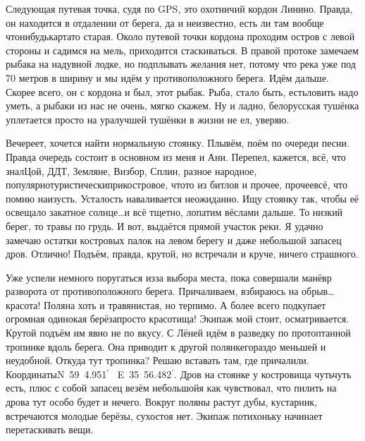 Следующая путевая точка, судя по GPS, это охотничий кордон Линино. Правда, он находится в отдалении от берега, да и неизвестно, есть ли там вообще что\sdash нибудь\mdash карта\sdash то старая. Около путевой точки кордона проходим остров с левой стороны и садимся на мель, приходится стаскиваться. В правой протоке замечаем рыбака на надувной лодке, но подплывать желания нет, потому что река уже под 70 метров в ширину и мы идём у противоположного берега. Идём дальше. Скорее всего, он с кордона и был, этот рыбак. Рыба, стало быть, есть\mdash ловить надо уметь, а рыбаки из нас не очень, мягко скажем. Ну и ладно, белорусская тушёнка уплетается просто на ура\mdash лучшей тушёнки в жизни не ел, уверяю.

Вечереет, хочется найти нормальную стоянку. Плывём, поём по очереди песни. Правда очередь состоит в основном из меня и Ани. Перепел, кажется, всё, что знал\mdash Цой, ДДТ, Земляне, Визбор, Сплин, разное народное, популярно\sdash туристически\sdash прикостровое, что\sdash то из битлов и прочее, прочее\mdash всё, что помню наизусть. Усталость наваливается неожиданно. Ищу стоянку так, чтобы её освещало закатное солнце\ldots и всё тщетно, лопатим вёслами дальше. То низкий берег, то травы по грудь. И вот, выдаётся прямой участок реки. Я удачно замечаю остатки костровых палок на левом берегу и даже небольшой запасец дров. Отлично! Подъём, правда, крутой, но встречали и круче, ничего страшного.

Уже успели немного поругаться из\sdash за выбора места, пока совершали манёвр разворота от противоположного берега. Причаливаем, взбираюсь на обрыв\ldots красота! Поляна хоть и травянистая, но терпимо. А более всего подкупает огромная одинокая берёза\mdash просто красотища! Экипаж мой стоит, осматривается. Крутой подъём им явно не по вкусу. С Лёней идём в разведку по протоптанной тропинке вдоль берега. Она приводит к другой полянке\mdash гораздо меньшей и неудобной. Откуда тут тропинка? 
\newpage
Решаю вставать там, где причалили. Координаты\mdash N~59\degree~4.951$^\prime$~ E~35\degree~56.482$^\prime$. Дров на стоянке у костровища чуть\sdash чуть есть, плюс с собой запасец везём небольшой\mdash я как чувствовал, что пилить на дрова тут особо будет и нечего. Вокруг поляны растут дубы, кустарник, встречаются молодые берёзы, сухостоя нет. Экипаж потихоньку начинает перетаскивать вещи. 


